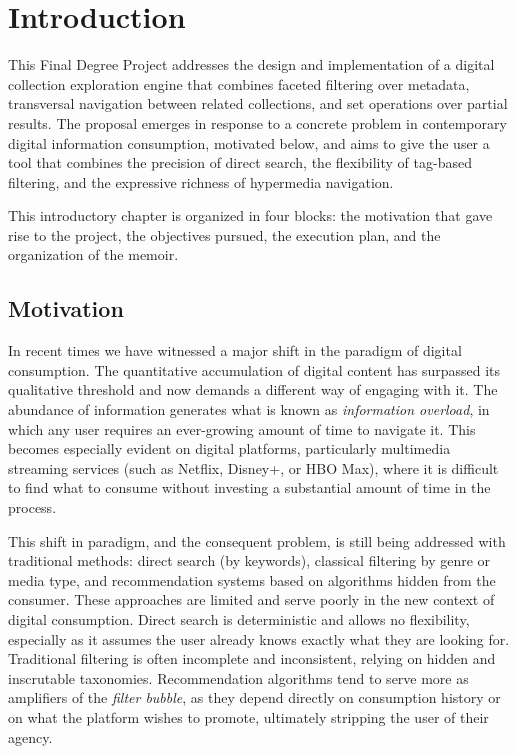 \chapter*{Introduction}
\label{cap:introduction}


This Final Degree Project addresses the design and implementation of a digital collection
exploration engine that combines faceted filtering over metadata, transversal navigation
between related collections, and set operations over partial results. The proposal emerges in
response to a concrete problem in contemporary digital information consumption, motivated
below, and aims to give the user a tool that combines the precision of direct search, the
flexibility of tag-based filtering, and the expressive richness of hypermedia navigation.

This introductory chapter is organized in four blocks: the motivation that gave rise to the
project, the objectives pursued, the execution plan, and the organization of the memoir.

\section*{Motivation}

In recent times we have witnessed a major shift in the paradigm of digital consumption. The
quantitative accumulation of digital content has surpassed its qualitative threshold and now
demands a different way of engaging with it. The abundance of information generates what is
known as \textit{information overload}, in which any user requires an ever-growing amount of
time to navigate it. This becomes especially evident on digital platforms, particularly
multimedia streaming services (such as Netflix, Disney+, or HBO Max), where it is difficult to
find what to consume without investing a substantial amount of time in the process.

This shift in paradigm, and the consequent problem, is still being addressed with traditional
methods: direct search (by keywords), classical filtering by genre or media type, and
recommendation systems based on algorithms hidden from the consumer. These approaches are
limited and serve poorly in the new context of digital consumption. Direct search is
deterministic and allows no flexibility, especially as it assumes the user already knows
exactly what they are looking for. Traditional filtering is often incomplete and inconsistent,
relying on hidden and inscrutable taxonomies. Recommendation algorithms tend to serve more as
amplifiers of the \textit{filter bubble}, as they depend directly on consumption history or on
what the platform wishes to promote, ultimately stripping the user of their agency.

